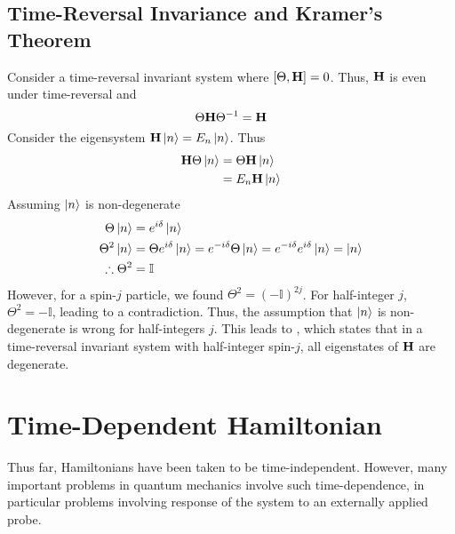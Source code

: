 \documentclass[12pt,a4paper,titlepage]{article}
\newcommand{\ul}[1]{\underline{\smash{#1}}} %
\begin{document}
\subsection{Time-Reversal Invariance and Kramer's Theorem}
Consider a time-reversal invariant system where $\comm{\Theta}{\vb{H}}=0$. Thus, $\vb{H}$ is even under time-reversal and
\begin{equation}
\Theta\vb{H}\Theta^{-1}=\vb{H}
\end{equation}
Consider the eigensystem $\vb{H}\ket{n}=E_{n}\ket{n}$. Thus
\begin{equation}
\begin{aligned}
\vb{H}\Theta\ket{n}&=\Theta\vb{H}\ket{n}\\
&=E_{n}\vb{H}\ket{n}
\end{aligned}
\end{equation}
Assuming $\ket{n}$ is non-degenerate
\begin{equation}
\begin{aligned}
\Theta\ket{n}&=e^{i\delta}\ket{n}\\
\Theta^{2}\ket{n}&=\Theta e^{i\delta}\ket{n}=e^{-i\delta}\Theta\ket{n}=e^{-i\delta}e^{i\delta}\ket{n}=\ket{n}\\
\therefore\Theta^{2}&=\mathbb{I}
\end{aligned}
\end{equation}
However, for a spin-$j$ particle, we found $\Theta^{2}=(-\mathbb{I})^{2j}$. For half-integer $j$, $\Theta^{2}=-\mathbb{I}$, leading to a contradiction. Thus, the assumption that $\ket{n}$ is non-degenerate is wrong for half-integers $j$. This leads to \ul{Kramer's theorem}, which states that in a time-reversal invariant system with half-integer spin-$j$, all eigenstates of $\vb{H}$ are degenerate.

\newpage
\section{Time-Dependent Hamiltonian}
Thus far, Hamiltonians have been taken to be time-independent. However, many important problems in quantum mechanics involve such time-dependence, in particular problems involving response of the system to an externally applied probe.\\
\end{document}
